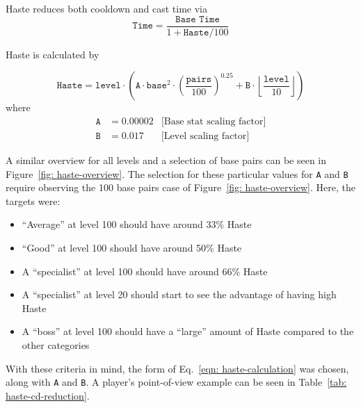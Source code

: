 





\newpage
{}

Haste reduces both cooldown and cast time via
\begin{equation}\label{eqn: haste-cdr}
	\texttt{Time} = \frac{\texttt{Base Time}}{1 + \texttt{Haste}/100}
\end{equation}

\noindent Haste is calculated by

\begin{equation}\label{eqn: haste-calculation}
	\texttt{Haste} = \texttt{level} \cdot \left( \texttt{A} \cdot \texttt{base}^2 \cdot \left(\frac{\texttt{pairs}}{100}\right)^{0.25} + \texttt{B} \cdot \left\lfloor \frac{\texttt{level}}{10} \right\rfloor \right)	
\end{equation}
\noindent where
\begin{align*}
	\texttt{A} &= 0.00002 	& \text{[Base stat scaling factor]}\\
	\texttt{B} &= 0.017		& \text{[Level scaling factor]}
\end{align*}

\noindent A similar overview for all levels and a selection of base pairs can be seen in Figure~\ref{fig: haste-overview}. The selection for these particular values for \texttt{A} and \texttt{B} require observing the 100 base pairs case of Figure~\ref{fig: haste-overview}. Here, the targets were:

\begin{itemize}
	\item{``Average'' at level 100 should have around 33\% Haste}
	\item{``Good'' at level 100 should have around 50\% Haste}
	\item{A ``specialist'' at level 100 should have around 66\% Haste}
	\item{A ``specialist'' at level 20 should start to see the advantage of having high Haste}
	\item{A ``boss'' at level 100 should have a ``large'' amount of Haste compared to the other categories}
\end{itemize}

With these criteria in mind, the form of Eq.~\eqref{eqn: haste-calculation} was chosen, along with \texttt{A} and \texttt{B}. A player's point-of-view example can be seen in Table~\ref{tab: haste-cd-reduction}.

